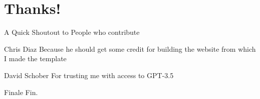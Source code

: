 \documentclass[aspectratio=169,9pt,xcolor=dvipsnames]{beamer}
\begin{document}
\section{Thanks!}
\begin{frame}{A Quick Shoutout to People who contribute}
    \begin{block}{Chris Diaz}
        Because he should get some credit for building the website from which I made the template
    \end{block}
    \begin{block}{David Schober}
        For trusting me with access to GPT-3.5
    \end{block}
\end{frame}
\begin{frame}{Finale}
    \centering
    Fin.
    
\end{frame}
\end{document}
